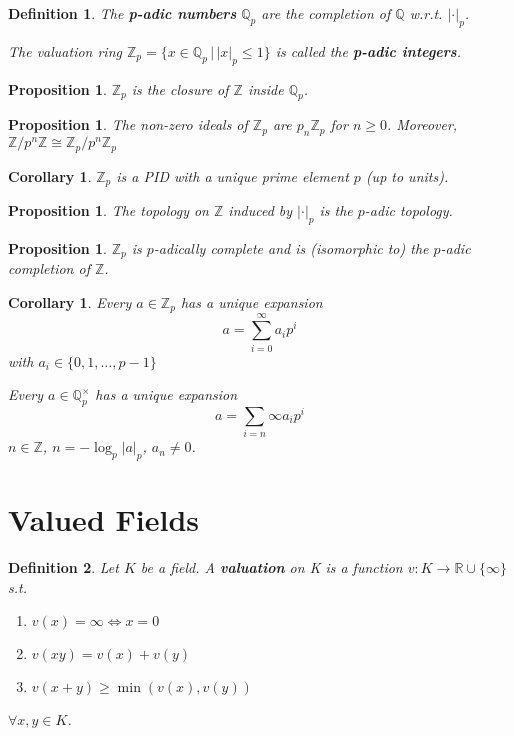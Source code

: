 \documentclass[a4paper]{article}
\newtheorem*{definition}{Definition}
\newtheorem{prop}[lemma]{Proposition}
\newtheorem{corollary}[lemma]{Corollary}
\newcommand*\abs[1]{\left|#1\right|}
\begin{document}
\begin{definition}
	The \textbf{p-adic numbers} $\mathbb{Q}_p$ are the completion of $\mathbb{Q}$ w.r.t. $\abs{\cdot}_p$.
	
	The valuation ring $\mathbb{Z}_p = \{x \in \mathbb{Q}_p \,|\, \abs{x}_p \leq 1 \}$ is called the \textbf{p-adic integers}.
\end{definition}

\begin{prop}
	$\mathbb{Z}_p$ is the closure of $\mathbb{Z}$ inside $\mathbb{Q}_p$.
\end{prop}

\begin{prop}
	The non-zero ideals of $\mathbb{Z}_p$ are $p_n\mathbb{Z}_p$ for $n \geq 0$. Moreover, $\mathbb{Z}/p^n\mathbb{Z} \cong \mathbb{Z}_p/p^n\mathbb{Z}_p$
\end{prop}

\begin{corollary}
	$\mathbb{Z}_p$ is a PID with a unique prime element $p$ (up to units).
\end{corollary}

\begin{prop}
	The topology on $\mathbb{Z}$ induced by $\abs{\cdot}_p$ is the $p$-adic topology.
\end{prop}

\begin{prop}
	$\mathbb{Z}_p$ is $p$-adically complete and is (isomorphic to) the $p$-adic completion of $\mathbb{Z}$.
\end{prop}

\begin{corollary}
	Every $a \in \mathbb{Z}_p$ has a unique expansion $$a = \sum_{i=0}^\infty a_ip^i$$ with $a_i \in \{0, 1, \dots, p-1\}$
	
	Every $a \in \mathbb{Q}_p^\times$ has a unique expansion $$a = \sum_{i=n}{\infty}a_ip^i$$ $n \in \mathbb{Z}$, $n = -\log_p\abs{a}_p$, $a_n \neq 0$.
\end{corollary}

\section{Valued Fields}
\begin{definition}
	Let $K$ be a field. A \textbf{valuation} on K is a function $v : K \to \mathbb{R} \cup \{\infty\}$ s.t.
	\begin{enumerate}[label=\roman*.]
		\item $v(x) = \infty \iff x = 0$
		\item $v(xy) = v(x)+v(y)$
		\item $v(x+y) \geq \min(v(x), v(y))$
	\end{enumerate}
	$\forall x, y \in K$.
\end{definition}
\end{document}
